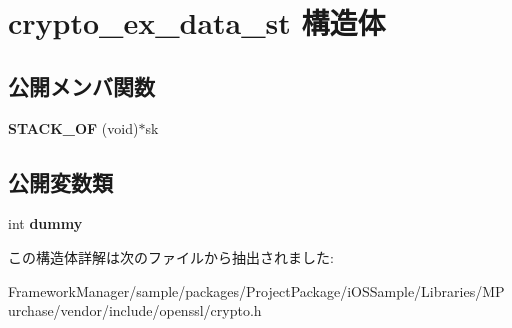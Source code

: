 \hypertarget{structcrypto__ex__data__st}{}\section{crypto\+\_\+ex\+\_\+data\+\_\+st 構造体}
\label{structcrypto__ex__data__st}
\subsection*{公開メンバ関数}
\begin{DoxyCompactItemize}
\item 
\hypertarget{structcrypto__ex__data__st_a0654d8495d0bf8129cb84000e19532c2}{}{\bfseries S\+T\+A\+C\+K\+\_\+\+O\+F} (void)$\ast$sk\label{structcrypto__ex__data__st_a0654d8495d0bf8129cb84000e19532c2}

\end{DoxyCompactItemize}
\subsection*{公開変数類}
\begin{DoxyCompactItemize}
\item 
\hypertarget{structcrypto__ex__data__st_a1aa7e9db2ba85dfdcde7d21eb9c6897d}{}int {\bfseries dummy}\label{structcrypto__ex__data__st_a1aa7e9db2ba85dfdcde7d21eb9c6897d}

\end{DoxyCompactItemize}


この構造体詳解は次のファイルから抽出されました\+:\begin{DoxyCompactItemize}
\item 
Framework\+Manager/sample/packages/\+Project\+Package/i\+O\+S\+Sample/\+Libraries/\+M\+Purchase/vendor/include/openssl/crypto.\+h\end{DoxyCompactItemize}

